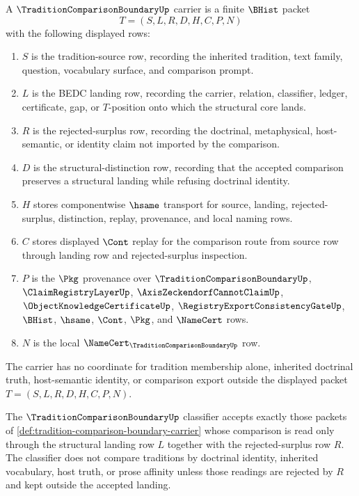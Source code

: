\begin{definition}
\label{def:tradition-comparison-boundary-carrier}
A $\TraditionComparisonBoundaryUp$ carrier is a finite $\BHist$ packet
$$
T=(S,L,R,D,H,C,P,N)
$$
with the following displayed rows:
\begin{enumerate}
\item $S$ is the tradition-source row, recording the inherited tradition, text family, question, vocabulary surface, and comparison prompt.
\item $L$ is the BEDC landing row, recording the carrier, relation, classifier, ledger, certificate, gap, or $T$-position onto which the structural core lands.
\item $R$ is the rejected-surplus row, recording the doctrinal, metaphysical, host-semantic, or identity claim not imported by the comparison.
\item $D$ is the structural-distinction row, recording that the accepted comparison preserves a structural landing while refusing doctrinal identity.
\item $H$ stores componentwise $\hsame$ transport for source, landing, rejected-surplus, distinction, replay, provenance, and local naming rows.
\item $C$ stores displayed $\Cont$ replay for the comparison route from source row through landing row and rejected-surplus inspection.
\item $P$ is the $\Pkg$ provenance over $\TraditionComparisonBoundaryUp$, $\ClaimRegistryLayerUp$, $\AxisZeckendorfCannotClaimUp$, $\ObjectKnowledgeCertificateUp$, $\RegistryExportConsistencyGateUp$, $\BHist$, $\hsame$, $\Cont$, $\Pkg$, and $\NameCert$ rows.
\item $N$ is the local $\NameCert_{\TraditionComparisonBoundaryUp}$ row.
\end{enumerate}
The carrier has no coordinate for tradition membership alone, inherited doctrinal truth, host-semantic identity, or comparison export outside the displayed packet $T=(S,L,R,D,H,C,P,N)$.
\end{definition}

\begin{definition}
\label{def:tradition-comparison-boundary-classifier}
The $\TraditionComparisonBoundaryUp$ classifier accepts exactly those packets of \autoref{def:tradition-comparison-boundary-carrier} whose comparison is read only through the structural landing row $L$ together with the rejected-surplus row $R$. The classifier does not compare traditions by doctrinal identity, inherited vocabulary, host truth, or prose affinity unless those readings are rejected by $R$ and kept outside the accepted landing.
\end{definition}

